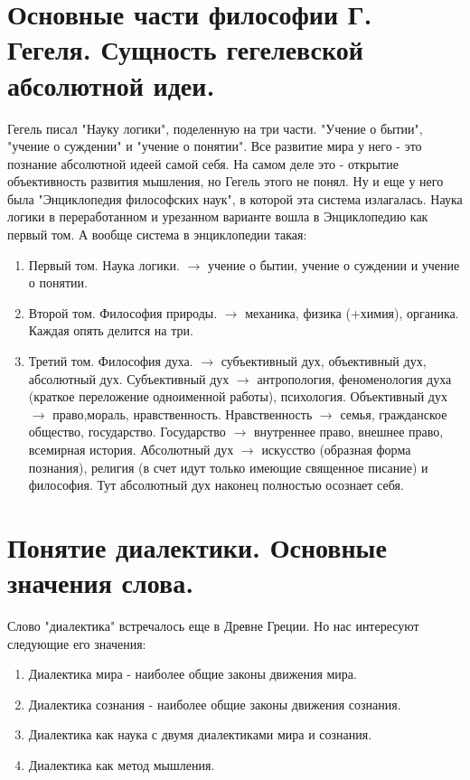 \section{ Основные части философии Г. Гегеля. Сущность гегелевской абсолютной идеи.}
Гегель писал "Науку логики", поделенную на три части. "Учение о бытии", "учение о суждении" и "учение о понятии".
Все развитие мира у него - это познание абсолютной идеей самой себя. На самом деле это  - открытие объективность развития мышления, но Гегель этого не понял. Ну и еще у него была "Энциклопедия философских наук", в которой эта система излагалась. Наука логики в переработанном и урезанном варианте вошла в Энциклопедию как первый том. А вообще система в энциклопедии такая:

\begin{enumerate}
\item Первый том. Наука логики.  $\rightarrow$ учение о бытии, учение о суждении и учение о понятии.

\item Второй том. Философия природы. $\rightarrow$ механика, физика (+химия), органика. Каждая опять делится на три.

\item Третий том. Философия духа. $\rightarrow$ субъективный дух, объективный дух, абсолютный дух.
Субъективный дух $\rightarrow$  антропология, феноменология духа (краткое переложение одноименной работы), психология. Объективный дух  $\rightarrow$ право,мораль, нравственность. Нравственность $\rightarrow$ семья, гражданское общество, государство. Государство $\rightarrow$ внутреннее право, внешнее право, всемирная история. Абсолютный дух $\rightarrow$ искусство (образная форма познания), религия (в счет идут только имеющие священное писание) и философия. Тут абсолютный дух наконец полностью осознает себя.
\end{enumerate}

\section{ Понятие диалектики. Основные значения слова.}
Слово "диалектика" встречалось еще в Древне Греции. Но нас интересуют следующие его значения:
\begin{enumerate}
\item Диалектика мира - наиболее общие законы движения мира.
\item Диалектика сознания - наиболее общие законы движения сознания.
\item Диалектика как наука с двумя диалектиками мира и сознания.
\item Диалектика как метод мышления.
\end{enumerate}

